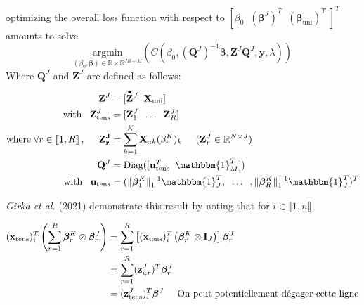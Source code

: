 \documentclass[10pt]{article}
\begin{document}
\noindent optimizing the overall loss function with respect to $\left[ \beta_0 \; \; \left(\bm{\beta}^J \right)^T \; \; \left( \bm{\beta}_{\text{uni}} \right)^T \; \right]^T$ amounts to solve
\begin{equation}
\underset{(\beta_0, \bm{\beta}) \in \mathbb{R} \times \mathbb{R}^{JR + M}}{\text{argmin}} \left( C(\beta_0, (\mathbf{Q}^J)^{-1}\bm{\beta},\mathbf{Z}^J \mathbf{Q}^J, \mathbf{y}, \lambda) \right)
\end{equation}
\noindent Where $\mathbf{Q}^J$ and $\mathbf{Z}^J$ are defined as follows: 
\begin{align}
\mathbf{Z}^J &= [\overset{\raisebox{-1ex}{\scalebox{0.8}{$\bullet$}}}{\mathbf{Z}}\mathrlap{^J} \; \; \; \; \mathbf{X}_{\text{uni}}]\\
\text{with} \; \; \; \mathbf{Z}_{\text{tens}}^J	&= [\mathbf{Z}_1^J \; \; \hdots \; \; \mathbf{Z}_R^J]\\
\text{where} \; \forall r \in \llbracket 1, R\rrbracket\, , \hspace{0.5 cm} \mathbf{Z_r^J} &= \sum\limits_{k = 1}^K \mathbf{X}_{::k} (\beta_r^K)_k \hspace{0.5 cm} (\mathbf{Z}_r^J \in \mathbb{R}^{N \times J})\\
\hspace{7 pt}
\mathbf{Q}^J &= \text{Diag}([\mathbf{u}_{\text{tens}}^T \; \; \mathbbm{1}_M^T])\\
\text{with} \; \; \; \mathbf{u}_{\text{tens}} &= (\lVert \bm{\beta}_1^K \rVert_1^{-1} \mathbbm{1}_J^T, \; \; \hdots \; \; , \lVert \bm{\beta}_R^K \rVert_1^{-1} \mathbbm{1}_J^T)^T
\end{align}

 \noindent \textit{Girka et al.} (2021) \cite{multi_rank_r} demonstrate this result by noting that for $i \in \llbracket 1, n\rrbracket$,

 \begin{align}
      (\mathbf{x}_{\text{tens}})_i^T \left( \sum\limits_{r = 1}^R \bm{\beta}_r^K \otimes \bm{\beta}_r^J \right) &= \sum\limits_{r = 1}^R \left[(\mathbf{x}_{\text{tens}})_i^T   \left( \bm{\beta}_r^K  \otimes \mathbf{I}_J\right)\right] \bm{\beta}_r^J\\
      &= \sum\limits_{r = 1}^R (\mathbf{z}_{i,r}^J)^T \bm{\beta}_r^J\\
      &= (\mathbf{z}_{\text{tens}}^J)_i^T \bm{\beta}^J \hspace{0.5 cm} \text{On peut potentiellement dégager cette ligne}
    \end{align}
\end{document}

